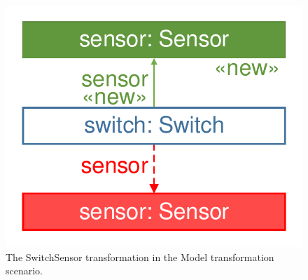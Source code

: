 \begin{figure}[!Htb]
	\centering
	\includegraphics[scale=0.4]{figures/trainbenchmark-transformation-xform-switchsensor}
	\caption{The \textsf{SwitchSensor} transformation in the Model transformation scenario.}
	\label{fig:trainbenchmark-transformation-xform-switchsensor}
\end{figure}


